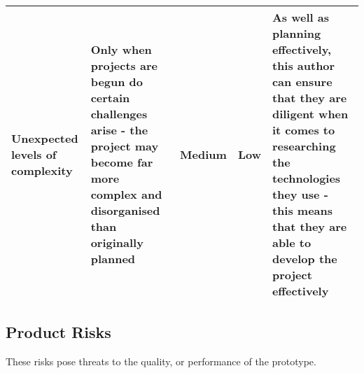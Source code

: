 \begin{tabularx}{\textwidth}{szssz}
    Unexpected levels of complexity & Only when projects are begun do certain challenges arise - the project may become far more complex and disorganised than originally planned & Medium & Low & As well as planning effectively, this author can ensure that they are diligent when it comes to researching the technologies they use - this means that they are able to develop the project effectively \\\hline

\end{tabularx}

\subsection{Product Risks}\label{subsec:product-risks}

These risks pose threats to the quality, or performance of the prototype.

